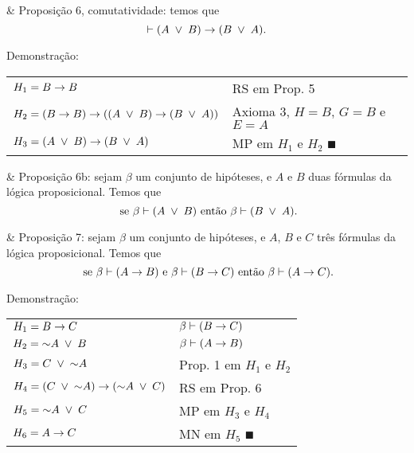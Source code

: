 \SKIP
  
\begin{easylist}

  & Proposição 6, comutatividade: temos que \[ \vdash (A \;\lor\; B) \rightarrow (B \;\lor\; A). \]

\end{easylist}

Demonstração:

\begin{tabular}{p{}p{}}
  \hline
    $H_1 = B \rightarrow B$                                           & RS em Prop. 5 \\
    $H_2 = (B \rightarrow B) \rightarrow ( (A \;\lor\; B) \rightarrow (B \;\lor\; A) )$       & Axioma 3, $H = B$, $G = B$ e $E = A$ \\
    $H_3 = (A \;\lor\; B) \rightarrow (B \;\lor\; A)$                           & MP em $H_1$ e $H_2$ $\QED$ \\
  \hline
\end{tabular}

\SKIP
  
\begin{easylist}

  & Proposição 6b: sejam $\beta$ um conjunto de hipóteses, e $A$ e $B$ duas fórmulas da lógica proposicional. Temos que \[ \mbox{ se } \beta \vdash (A \;\lor\; B) \mbox{ então } \beta \vdash (B \;\lor\; A). \]

  & Proposição 7: sejam $\beta$ um conjunto de hipóteses, e $A$, $B$ e $C$ três fórmulas da lógica proposicional. Temos que \[ \mbox{ se } \beta \vdash (A \rightarrow B) \mbox{ e } \beta \vdash (B \rightarrow C) \mbox{ então } \beta \vdash (A \rightarrow C). \]

\end{easylist}

Demonstração:

\begin{tabular}{p{}p{}}
  \hline
    $H_1 = B \rightarrow C$                                           & $ \beta \vdash (B \rightarrow C)$ \\
    $H_2 = \mathord{\sim} A \;\lor\; B$                                       & $ \beta \vdash (A \rightarrow B)$ \\
    $H_3 = C \;\lor\; \mathord{\sim} A$                                       & Prop. 1 em $H_1$ e $H_2$ \\
    $H_4 = (C \;\lor\; \mathord{\sim} A) \rightarrow (\mathord{\sim} A \;\lor\; C)$                 & RS em Prop. 6 \\
    $H_5 = \mathord{\sim} A \;\lor\; C$                                       & MP em $H_3$ e $H_4$ \\
    $H_6 = A \rightarrow C$                                           & MN em $H_5$ $\QED$ \\
  \hline
\end{tabular}


